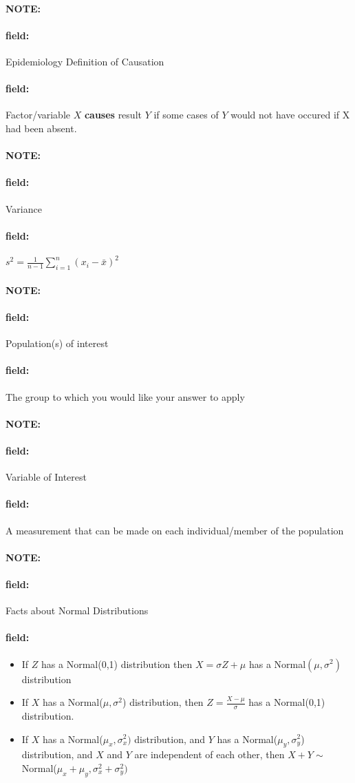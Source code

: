 \documentclass[12pt]{article}
\newenvironment{note}{\paragraph{NOTE:}}{}
\newenvironment{field}{\paragraph{field:}}{}
\begin{document}
\begin{note}
	\begin{field}
		Epidemiology Definition of Causation
	\end{field}
	\begin{field}
		Factor/variable $X$ \textbf{causes} result $Y$ if some cases of $Y$ would not have occured if X had been absent.
	\end{field}
\end{note}

\begin{note}
	\begin{field}
		Variance
	\end{field}
	\begin{field}
		$s^2 = \frac{1}{n-1}\sum_{i=1}^n(x_i - \bar{x})^2$
	\end{field}
\end{note}

\begin{note}
	\begin{field}
		Population(s) of interest
	\end{field}
	\begin{field}
		The group to which you would like your answer to apply
	\end{field}
\end{note}

\begin{note}
	\begin{field}
		Variable of Interest
	\end{field}
	\begin{field}
		A measurement that can be made on each individual/member of the population
	\end{field}
\end{note}

\begin{note}
	\begin{field}
		Facts about Normal Distributions
	\end{field}
	\begin{field}
		\begin{itemize}
			\item If $Z$ has a Normal(0,1) distribution then $X = \sigma Z + \mu$ has a Normal$(\mu,\sigma^2)$ distribution
			\item If $X$ has a Normal($\mu,\sigma^2$) distribution, then $Z = \frac{X - \mu}{\sigma}$ has a Normal(0,1) distribution.
			\item If $X$ has a Normal($\mu_x,\sigma^2_x)$ distribution, and $Y$ has a Normal($\mu_y,\sigma_y^2$) distribution, and $X$ and $Y$ are independent of each other, then $X + Y \sim $ Normal($\mu_x + \mu_y, \sigma_x^2 + \sigma_y^2)$
		\end{itemize}
	\end{field}
\end{note}
\end{document}
